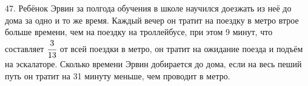 47. Ребёнок Эрвин за полгода обучения в школе научился доезжать из неё до дома за одно и то же время. Каждый вечер он тратит на поездку в метро втрое больше времени, чем на поездку на троллейбусе, при этом 9 минут, что составляет $\cfrac{3}{13}$ от всей поездки в метро, он тратит на ожидание поезда и подъём на эскалаторе. Сколько времени Эрвин добирается до дома, если на весь пеший путь он тратит на 31 минуту меньше, чем проводит в метро.\\
